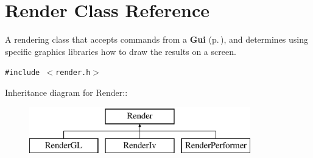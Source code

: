 \section{Render  Class Reference}
\label{classRender}
A rendering class that accepts commands from a {\bf Gui} {\rm (p.\,\pageref{classGui})}, and determines using specific graphics libraries how to draw the results on a screen. 


{\tt \#include $<$render.h$>$}

Inheritance diagram for Render::\begin{figure}[H]
\begin{center}
\leavevmode
\includegraphics[height=2cm]{classRender}
\end{center}
\end{figure}
